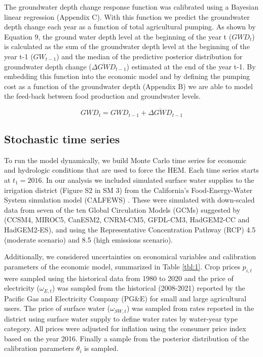 \documentclass[a4paper,fleqn]{cas-sc}
\begin{document}
The groundwater depth change response function was calibrated using a Bayesian linear regression (Appendix C). With this function we predict the groundwater depth change each year as a function of total agricultural pumping. As shown by Equation 9, the ground water depth level at the beginning of the year t ($GWD_{t}$) is calculated as the sum of the groundwater depth level at the beginning of the year t-1 ($GW_{t-1}$)  and the median of the predictive posterior distribution for groundwater depth change ($\overline{\Delta GWD}_{t-1}$) estimated at the end of the year t-1. By embedding this function into the economic model and by defining the pumping cost as a function of the groundwater depth (Appendix B) we are able to model the feed-back between food production and groundwater levels. 

\begin{equation}
GWD_{t} = GWD_{t-1} + \overline{\Delta GWD}_{t-1}
\end{equation}

\subsection{Stochastic time series}

To run the model dynamically, we build Monte Carlo time series for economic and hydrologic conditions that are used to force the HEM. Each time series starts at $t_{1}=2016$. In our analysis we included simulated surface water supplies to the irrigation district (Figure S2 in SM 3) from the California’s Food-Energy-Water System simulation model (CALFEWS) \citep{zeff_californias_2021}. These were simulated with down-scaled data from seven of the ten Global Circulation Models (GCMs) suggested by \citet{pierce_climate_2018} (CCSM4, MIROC5, CanESM2, CNRM-CM5, GFDL-CM3, HadGEM2-CC and HadGEM2-ES), and using the Representative Concentration Pathway (RCP) 4.5 (moderate scenario) and 8.5 (high emissions scenario). 

Additionally, we considered uncertainties on economical variables and calibration parameters of the economic model, summarized in Table \ref{tbl:1}. Crop prices $p_{i,t}$ were sampled using the historical data from 1980 to 2020 \citep{usda_national_2020} and the price of electricity ($\omega_{E,t}$) was sampled from the historical (2008-2021) reported by the Pacific Gas and Electricity Company (PG\&E) for small and large agricultural users. The price of surface water ($\omega_{SW,t}$) was sampled from rates reported in the district using surface water supply to define water rates by water-year type category. All prices were adjusted for inflation using the consumer price index based on the year 2016. Finally a sample from the posterior distribution of the calibration parameters $\theta_{i}$ is sampled.
\end{document}
